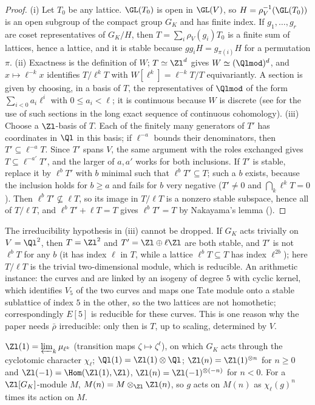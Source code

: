 \begin{proof}
(i) Let $T_0$ be any lattice. $\GL(T_0)$ is open in $\GL(V)$, so $H=\rho_V^{-1}(\GL(T_0))$ is an open subgroup of the compact group $G_K$ and has
finite index. If $g_1,\dots,g_r$ are coset representatives of $G_K/H$, then $T=\sum_i\rho_V(g_i)T_0$ is a finite sum of lattices, hence a lattice,
and it is stable because $gg_iH=g_{\pi(i)}H$ for a permutation $\pi$. (ii) Exactness is the definition of $W$; $T\simeq\Zl^d$ gives $W\simeq(\Qlmod)^d$, and
$x\mapsto\ell^{-k}x$ identifies $T/\ell^kT$ with $W[\ell^k]=\ell^{-k}T/T$ equivariantly. A section is given by choosing, in a basis of $T$, the representatives
of $\Qlmod$ of the form $\sum_{i<0}a_i\ell^i$ with $0\le a_i<\ell$; it is continuous because $W$ is discrete (see  for the use of
such sections in the long exact sequence of continuous cohomology). (iii) Choose a $\Zl$-basis of $T$. Each of the finitely many generators of
$T'$ has coordinates in $\Ql$ in this basis; if $\ell^{-a}$ bounds their denominators, then $T'\subseteq\ell^{-a}T$. Since $T'$ spans $V$, the same argument with the roles
exchanged gives $T\subseteq\ell^{-a'}T'$, and the larger of $a,a'$ works for both inclusions. If $T'$ is stable, replace it by $\ell^bT'$ with $b$ minimal such that
$\ell^bT'\subseteq T$; such a $b$ exists, because the inclusion holds for $b\ge a$ and fails for $b$ very negative ($T'\ne0$ and $\bigcap_k\ell^kT=0$). Then $\ell^bT'\not\subseteq\ell T$,
so its image in $T/\ell T$ is a nonzero stable subspace, hence all of $T/\ell T$, and $\ell^bT'+\ell T=T$ gives $\ell^bT'=T$ by Nakayama's lemma
().
\end{proof}

The irreducibility hypothesis in (iii) cannot be dropped. If $G_K$ acts trivially on $V=\Ql^2$, then $T=\Zl^2$ and $T'=\Zl\oplus\ell\Zl$ are both stable, and $T'$ is not
$\ell^bT$ for any $b$ (it has index $\ell$ in $T$, while a lattice $\ell^bT\subseteq T$ has index $\ell^{2b}$); here $T/\ell T$ is the trivial two-dimensional module, which is
reducible. An arithmetic instance: the curves  and  are linked by an isogeny of degree $5$ with cyclic kernel, which identifies $V_5$ of the two
curves and maps one Tate module onto a stable sublattice of index $5$ in the other, so the two lattices are not homothetic; correspondingly $E[5]$ is reducible for these curves. This is one reason why the paper needs
$\bar\rho$ irreducible: only then is $T$, up to scaling, determined by $V$.

\begin{definition}\label{def:blochkato:twists}
$\Zl(1)=\varprojlim_k\mu_{\ell^k}$ (transition maps $\zeta\mapsto\zeta^\ell$), on which $G_K$ acts through the cyclotomic character $\chi_\ell$; $\Ql(1)=\Zl(1)\otimes\Ql$;
$\Zl(n)=\Zl(1)^{\otimes n}$ for $n\ge0$ and $\Zl(-1)=\Hom(\Zl(1),\Zl)$, $\Zl(n)=\Zl(-1)^{\otimes(-n)}$ for $n<0$. For a $\Zl[G_K]$-module $M$,
$M(n)=M\otimes_{\Zl}\Zl(n)$, so $g$ acts on $M(n)$ as $\chi_\ell(g)^n$ times its action on $M$.
\end{definition}

